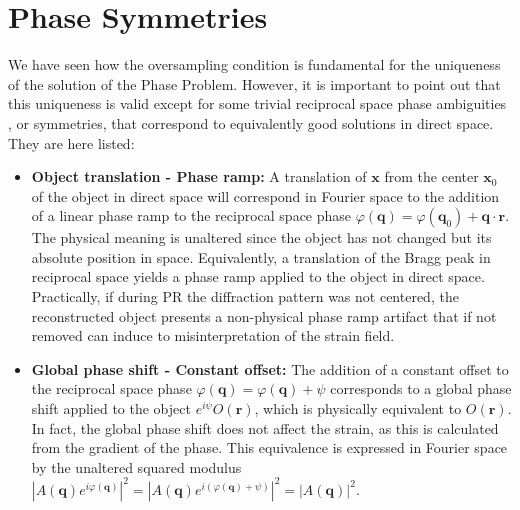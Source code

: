 \section{Phase Symmetries}
We have seen how the oversampling condition is fundamental for the uniqueness of the solution of the Phase Problem. 
However, it is important to point out that this uniqueness is valid except for some trivial reciprocal space phase ambiguities 
\cite{fienup_phase_1982,Millane1990}, or symmetries, that correspond to equivalently good solutions in direct space. They are here listed: 
\begin{itemize}

    \item \textbf{Object translation - Phase ramp:} A translation of $\mathbf{x} $ from the center $\mathbf{x}_0$ 
    of the object in direct space will correspond in Fourier space to the addition of a linear phase ramp to the reciprocal 
    space phase $\varphi(\mathbf{q}) = \varphi(\mathbf{q}_0) + \mathbf{q} \cdot \mathbf{r}$. The physical meaning is unaltered 
    since the object has not changed but its absolute position in space. Equivalently, a translation of the Bragg peak in reciprocal 
    space yields a phase ramp applied to the object in direct space. Practically, if 
    during PR the diffraction pattern was not centered, the reconstructed object presents a non-physical phase ramp artifact 
    that if not removed can induce to misinterpretation of the strain field. 

    \item \textbf{Global phase shift - Constant offset:} The addition of a constant offset to the reciprocal space phase 
    $\varphi(\mathbf{q}) = \varphi(\mathbf{q}) + \psi$ corresponds to a global phase shift applied to the object $e^{i\psi}O(\mathbf{r})$, 
    which is physically equivalent to $O(\mathbf{r})$. 
    In fact, the global phase shift does not affect the strain, as this is calculated from the gradient of the phase. 
    This equivalence is expressed in Fourier space by the unaltered squared modulus 
    $|A(\mathbf{q})e^{i\varphi(\mathbf{q})}|^2 = |A(\mathbf{q})e^{i(\varphi(\mathbf{q}) + \psi)}|^2 = |A(\mathbf{q})|^2 $.
    

\end{itemize}
